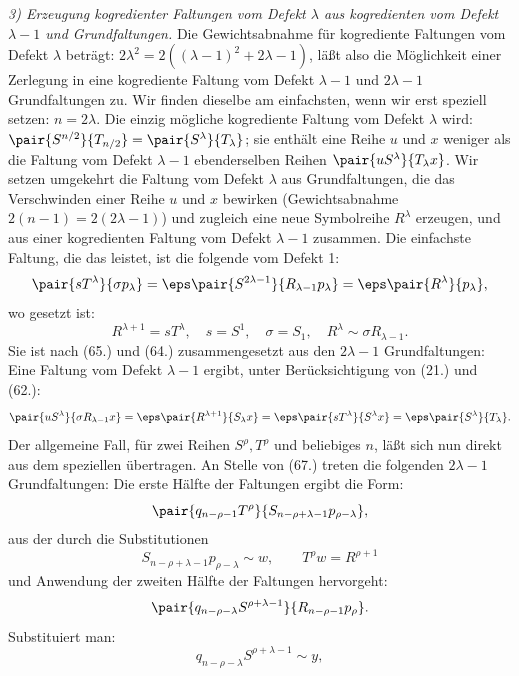 \emph{3) Erzeugung kogredienter Faltungen vom Defekt $\lambda$ aus kogredienten vom Defekt $\lambda-1$ und Grundfaltungen.} Die Gewichtsabnahme f\"ur kogrediente Faltungen vom Defekt $\lambda$ betr\"agt: $2\lambda^2=2((\lambda-1)^2+2\lambda-1)$, l\"a\ss t also die M\"oglichkeit einer Zerlegung in eine kogrediente Faltung vom Defekt $\lambda-1$ und $2\lambda-1$ Grundfaltungen zu. Wir finden dieselbe am einfachsten, wenn wir erst speziell setzen: $n=2\lambda$. Die einzig m\"ogliche kogrediente Faltung vom Defekt $\lambda$ wird: $\pair{S^{n/2}}{T_{n/2}}=\pair{S^\lambda}{T_\lambda}$; sie enth\"alt eine Reihe $u$ und $x$ weniger als die Faltung vom Defekt $\lambda-1$ ebenderselben Reihen $\pair{uS^\lambda}{T_\lambda x}$. Wir setzen umgekehrt die Faltung vom Defekt $\lambda$ aus Grundfaltungen, die das Verschwinden einer Reihe $u$ und $x$ bewirken (Gewichtsabnahme $2(n-1)=2(2\lambda-1)$) und zugleich eine neue Symbolreihe $R^\lambda$ erzeugen, und aus einer kogredienten Faltung vom Defekt $\lambda-1$ zusammen. Die einfachste Faltung, die das leistet, ist die folgende vom Defekt 1:
\[
 \pair{sT^\lambda}{\sigma p_\lambda}=\eps\pair{S^{2\lambda-1}}{R_{\lambda-1}p_\lambda}=\eps\pair{R^\lambda}{p_\lambda},
\]
wo gesetzt ist:
\[
 R^{\lambda+1}=sT^\lambda,
 \quad s=S^1,
 \quad \sigma=S_1,
 \quad R^\lambda\sim\sigma R_{\lambda-1}.
\]
Sie ist nach (65.) und (64.) zusammengesetzt aus den $2\lambda-1$ Grundfaltungen:
Eine Faltung vom Defekt $\lambda-1$ ergibt, unter Ber\"ucksichtigung von (21.) und (62.):
\[
 \pair{uS^\lambda}{\sigma R_{\lambda-1}x}=\eps\pair{R^{\lambda+1}}{S_\lambda x}
 =\eps\pair{sT^\lambda}{S^\lambda x}=\eps\pair{S^\lambda}{T_\lambda}.
\]
Der allgemeine Fall, f\"ur zwei Reihen $S^\rho,T^\rho$ und beliebiges $n$, l\"a\ss t sich nun direkt aus dem speziellen \"ubertragen. An Stelle von (67.) treten die folgenden $2\lambda-1$ Grundfaltungen:
Die erste H\"alfte der Faltungen ergibt die Form:
\[
 \pair{q_{n-\rho-1}T^\rho}{S_{n-\rho+\lambda-1}p_{\rho-\lambda}},
\]
aus der durch die Substitutionen
\[
 S_{n-\rho+\lambda-1}p_{\rho-\lambda}\sim w,
 \qquad T^\rho w=R^{\rho+1}
\]
und Anwendung der zweiten H\"alfte der Faltungen hervorgeht:
\[
 \pair{q_{n-\rho-\lambda}S^{\rho+\lambda-1}}{R_{n-\rho-1}p_\rho}.
\]
Substituiert man:
\[
 q_{n-\rho-\lambda}S^{\rho+\lambda-1}\sim y,
\]
